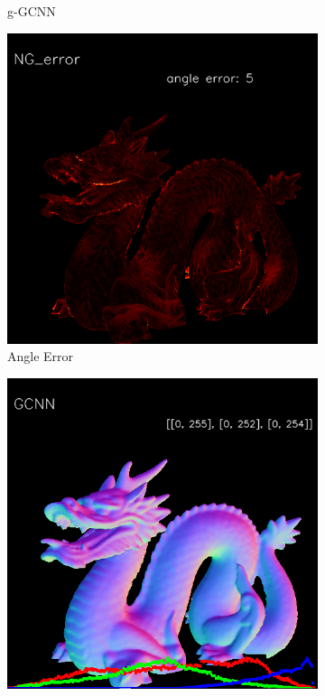\begin{figure}[h!]
\begin{subfigure}[b]{0.19\linewidth}
		\caption{g-GCNN}
	\end{subfigure}
	\begin{subfigure}[b]{0.19\linewidth}
		\includegraphics[width=\linewidth]{./Figures/ng-synthetic/fancy_eval_3_error_NG.png}
		\caption{Angle Error}
	\end{subfigure}
	\begin{subfigure}[b]{0.19\linewidth}
		\includegraphics[width=\linewidth]{./Figures/gcnn-synthetic/fancy_eval_3_normal_GCNN.png}

\end{subfigure}
\end{figure}

